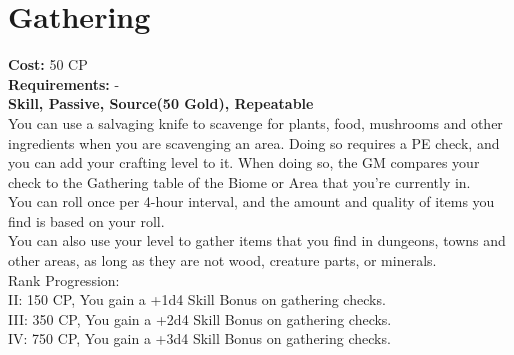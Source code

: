 \section{Gathering}\label{perk:gathering}
\textbf{Cost:} 50 CP\\
\textbf{Requirements:} -\\
\textbf{Skill, Passive, Source(50 Gold), Repeatable}\\
You can use a salvaging knife to scavenge for plants, food, mushrooms and other ingredients when you are scavenging an area.
Doing so requires a PE check, and you can add your crafting level to it.
When doing so, the GM compares your check to the Gathering table of the Biome or Area that you're currently in.\\
You can roll once per 4-hour interval, and the amount and quality of items you find is based on your roll.\\
You can also use your level to gather items that you find in dungeons, towns and other areas, as long as they are not wood, creature parts, or minerals.
\\
Rank Progression:\\
II: 150 CP, You gain a +1d4 Skill Bonus on gathering checks.\\
III: 350 CP, You gain a +2d4 Skill Bonus on gathering checks.\\
IV: 750 CP, You gain a +3d4 Skill Bonus on gathering checks.\\